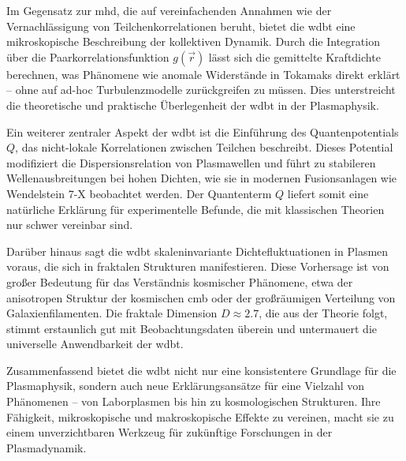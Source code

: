 Im Gegensatz zur \gls{mhd}, die auf vereinfachenden Annahmen wie der Vernachlässigung von Teilchenkorrelationen beruht, bietet die \gls{wdbt} eine mikroskopische Beschreibung der
kollektiven Dynamik. Durch die Integration über die Paarkorrelationsfunktion $g(\vec{r})$ lässt sich die gemittelte Kraftdichte berechnen, was Phänomene wie anomale Widerstände
in Tokamaks direkt erklärt – ohne auf ad-hoc Turbulenzmodelle zurückgreifen zu müssen. Dies unterstreicht die theoretische und praktische Überlegenheit der \gls{wdbt} in der
Plasmaphysik.

Ein weiterer zentraler Aspekt der \gls{wdbt} ist die Einführung des Quantenpotentials $Q$, das nicht-lokale Korrelationen zwischen Teilchen beschreibt. Dieses Potential modifiziert
die Dispersionsrelation von Plasmawellen und führt zu stabileren Wellenausbreitungen bei hohen Dichten, wie sie in modernen Fusionsanlagen wie Wendelstein 7-X beobachtet werden.
Der Quantenterm $Q$ liefert somit eine natürliche Erklärung für experimentelle Befunde, die mit klassischen Theorien nur schwer vereinbar sind.

Darüber hinaus sagt die \gls{wdbt} skaleninvariante Dichtefluktuationen in Plasmen voraus, die sich in fraktalen Strukturen manifestieren. Diese Vorhersage ist von großer Bedeutung
für das Verständnis kosmischer Phänomene, etwa der anisotropen Struktur der kosmischen \gls{cmb} oder der großräumigen Verteilung von Galaxienfilamenten. Die fraktale Dimension
$D \approx 2.7$, die aus der Theorie folgt, stimmt erstaunlich gut mit Beobachtungsdaten überein und untermauert die universelle Anwendbarkeit der \gls{wdbt}.

Zusammenfassend bietet die \gls{wdbt} nicht nur eine konsistentere Grundlage für die Plasmaphysik, sondern auch neue Erklärungsansätze für eine Vielzahl von Phänomenen – von
Laborplasmen bis hin zu kosmologischen Strukturen. Ihre Fähigkeit, mikroskopische und makroskopische Effekte zu vereinen, macht sie zu einem unverzichtbaren Werkzeug für zukünftige
Forschungen in der Plasmadynamik.
